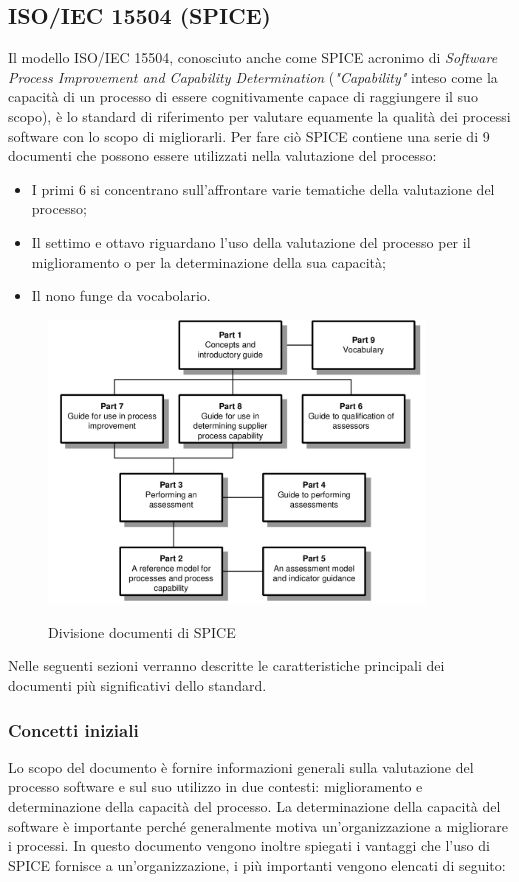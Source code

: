 \documentclass[../piano-di-qualifica.tex]{subfiles}
\begin{document}
\subsection{ISO/IEC 15504 (SPICE)}%
\label{sec:iso/iec_15504_spice}
Il modello ISO/IEC 15504, conosciuto anche come SPICE acronimo di \textit{Software Process Improvement and Capability Determination} (\textit{"Capability"} inteso come la capacità di un processo di essere cognitivamente capace di raggiungere il suo scopo), è lo standard di riferimento per valutare equamente la qualità dei processi software con lo scopo di migliorarli.
Per fare ciò SPICE contiene una serie di 9 documenti che possono essere utilizzati nella valutazione del processo:
\begin{itemize}
    \item I primi 6 si concentrano sull'affrontare varie tematiche della valutazione del processo;
    \item Il settimo e ottavo riguardano l'uso della valutazione del processo per il miglioramento o per la determinazione della sua capacità;
    \item Il nono funge da vocabolario.
\end{itemize}

\begin{figure}[H]
    \centering
    \includegraphics[width=10cm]{img/spice_doc.png}
    \label{fig:spice_documenti}
    \caption{Divisione documenti di SPICE}
\end{figure}


Nelle seguenti sezioni verranno descritte le caratteristiche principali dei documenti più significativi dello standard.

\subsubsection{Concetti iniziali}
\label{sub:concetti_iniziali}
Lo scopo del documento è fornire informazioni generali sulla valutazione del processo software e sul suo utilizzo in due contesti: miglioramento e determinazione della capacità del processo.
La determinazione della capacità del software è importante perché generalmente motiva un'organizzazione a migliorare i processi.
In questo documento vengono inoltre spiegati i vantaggi che l'uso di SPICE fornisce a un'organizzazione, i più importanti vengono elencati di seguito:
\end{document}
